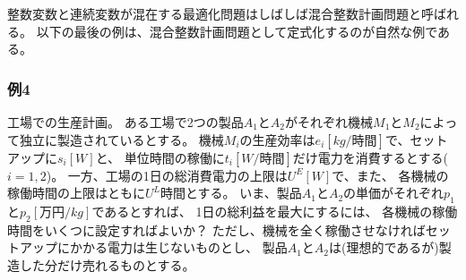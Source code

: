 \documentclass[12pt]{jarticle}
\begin{document}
整数変数と連続変数が混在する最適化問題はしばしば混合整数計画問題と呼ばれる。
以下の最後の例は、混合整数計画問題として定式化するのが自然な例である。

\subsubsection*{例4}
工場での生産計画。
ある工場で2つの製品$A_1$と$A_2$がそれぞれ機械$M_1$と$M_2$によって独立に製造されているとする。
機械$M_i$の生産効率は$e_i[kg/時間]$で、セットアップに$s_i[W]$と、
単位時間の稼働に$t_i[W/時間]$だけ電力を消費するとする($i=1,2$)。
一方、工場の1日の総消費電力の上限は$U^E[W]$で、また、
各機械の稼働時間の上限はともに$U^L$時間とする。
いま、製品$A_1$と$A_2$の単価がそれぞれ$p_1$と$p_2[万円/kg]$であるとすれば、
1日の総利益を最大にするには、
各機械の稼働時間をいくつに設定すればよいか？
ただし、機械を全く稼働させなければセットアップにかかる電力は生じないものとし、
製品$A_1$と$A_2$は(理想的であるが)製造した分だけ売れるものとする。

\clearpage
\end{document}
